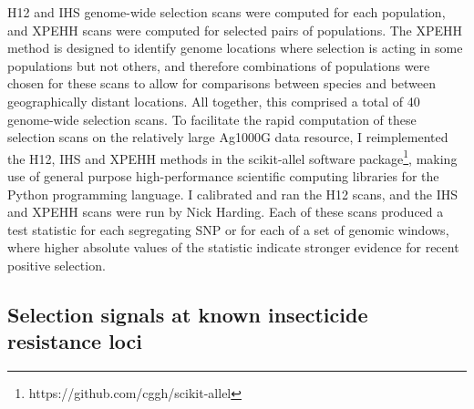 \begin{refsection}
H12 and IHS genome-wide selection scans were computed for each population, and XPEHH scans were computed for selected pairs of populations.
%
The XPEHH method is designed to identify genome locations where selection is acting in some populations but not others, and therefore combinations of populations were chosen for these scans to allow for comparisons between species and between geographically distant locations.
%
All together, this comprised a total of 40 genome-wide selection scans.
%
To facilitate the rapid computation of these selection scans on the relatively large Ag1000G data resource, I reimplemented the H12, IHS and XPEHH methods in the scikit-allel software package\footnote{https://github.com/cggh/scikit-allel}, making use of general purpose high-performance scientific computing libraries for the Python programming language.
%
I calibrated and ran the H12 scans, and the IHS and XPEHH scans were run by Nick Harding.
%
Each of these scans produced a test statistic for each segregating SNP or for each of a set of genomic windows, where higher absolute values of the statistic indicate stronger evidence for recent positive selection.


\subsection{Selection signals at known insecticide resistance loci}\label{subsec:known-loci}



\end{refsection}
